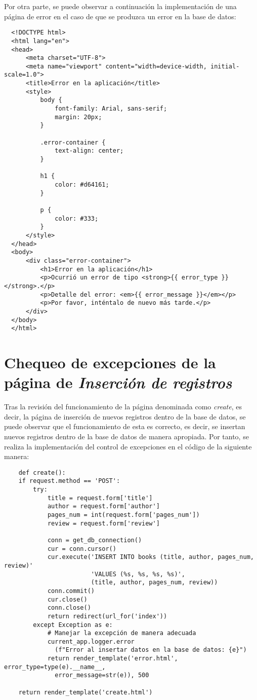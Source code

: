 \documentclass[11pt]{report}
\begin{document}
Por otra parte, se puede observar a continuación la implementación de una página de error en el caso de que se produzca un error en la base de datos:

\begin{verbatim}
  <!DOCTYPE html>
  <html lang="en">
  <head>
      <meta charset="UTF-8">
      <meta name="viewport" content="width=device-width, initial-scale=1.0">
      <title>Error en la aplicación</title>
      <style>
          body {
              font-family: Arial, sans-serif;
              margin: 20px;
          }

          .error-container {
              text-align: center;
          }

          h1 {
              color: #d64161;
          }

          p {
              color: #333;
          }
      </style>
  </head>
  <body>
      <div class="error-container">
          <h1>Error en la aplicación</h1>
          <p>Ocurrió un error de tipo <strong>{{ error_type }}</strong>.</p>
          <p>Detalle del error: <em>{{ error_message }}</em></p>
          <p>Por favor, inténtalo de nuevo más tarde.</p>
      </div>
  </body>
  </html>
  \end{verbatim}

\section{Chequeo de excepciones de la página de \emph{Inserción de registros}}

Tras la revisión del funcionamiento de la página denominada como \emph{create}, es decir, la página de inserción de nuevos registros dentro de la base de datos, se puede observar que el funcionamiento de esta es correcto, es decir, se insertan nuevos registros dentro de la base de datos de manera apropiada. Por tanto, se realiza la implementación del control de excepciones en el código de la siguiente manera:

\begin{verbatim}
    def create():
    if request.method == 'POST':
        try:
            title = request.form['title']
            author = request.form['author']
            pages_num = int(request.form['pages_num'])
            review = request.form['review']

            conn = get_db_connection()
            cur = conn.cursor()
            cur.execute('INSERT INTO books (title, author, pages_num, review)'
                        'VALUES (%s, %s, %s, %s)',
                        (title, author, pages_num, review))
            conn.commit()
            cur.close()
            conn.close()
            return redirect(url_for('index'))
        except Exception as e:
            # Manejar la excepción de manera adecuada
            current_app.logger.error
              (f"Error al insertar datos en la base de datos: {e}")
            return render_template('error.html', error_type=type(e).__name__, 
              error_message=str(e)), 500

    return render_template('create.html')
  \end{verbatim}
\end{document}
